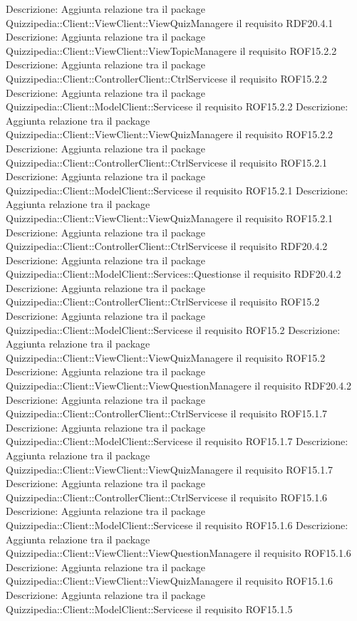 Descrizione: Aggiunta relazione tra il package Quizzipedia::Client::ViewClient::ViewQuizManagere il requisito RDF20.4.1 
Descrizione: Aggiunta relazione tra il package Quizzipedia::Client::ViewClient::ViewTopicManagere il requisito ROF15.2.2 
Descrizione: Aggiunta relazione tra il package Quizzipedia::Client::ControllerClient::CtrlServicese il requisito ROF15.2.2 
Descrizione: Aggiunta relazione tra il package Quizzipedia::Client::ModelClient::Servicese il requisito ROF15.2.2 
Descrizione: Aggiunta relazione tra il package Quizzipedia::Client::ViewClient::ViewQuizManagere il requisito ROF15.2.2 
Descrizione: Aggiunta relazione tra il package Quizzipedia::Client::ControllerClient::CtrlServicese il requisito ROF15.2.1 
Descrizione: Aggiunta relazione tra il package Quizzipedia::Client::ModelClient::Servicese il requisito ROF15.2.1 
Descrizione: Aggiunta relazione tra il package Quizzipedia::Client::ViewClient::ViewQuizManagere il requisito ROF15.2.1 
Descrizione: Aggiunta relazione tra il package Quizzipedia::Client::ControllerClient::CtrlServicese il requisito RDF20.4.2 
Descrizione: Aggiunta relazione tra il package Quizzipedia::Client::ModelClient::Services::Questionse il requisito RDF20.4.2 
Descrizione: Aggiunta relazione tra il package Quizzipedia::Client::ControllerClient::CtrlServicese il requisito ROF15.2 
Descrizione: Aggiunta relazione tra il package Quizzipedia::Client::ModelClient::Servicese il requisito ROF15.2 
Descrizione: Aggiunta relazione tra il package Quizzipedia::Client::ViewClient::ViewQuizManagere il requisito ROF15.2 
Descrizione: Aggiunta relazione tra il package Quizzipedia::Client::ViewClient::ViewQuestionManagere il requisito RDF20.4.2 
Descrizione: Aggiunta relazione tra il package Quizzipedia::Client::ControllerClient::CtrlServicese il requisito ROF15.1.7 
Descrizione: Aggiunta relazione tra il package Quizzipedia::Client::ModelClient::Servicese il requisito ROF15.1.7 
Descrizione: Aggiunta relazione tra il package Quizzipedia::Client::ViewClient::ViewQuizManagere il requisito ROF15.1.7 
Descrizione: Aggiunta relazione tra il package Quizzipedia::Client::ControllerClient::CtrlServicese il requisito ROF15.1.6 
Descrizione: Aggiunta relazione tra il package Quizzipedia::Client::ModelClient::Servicese il requisito ROF15.1.6 
Descrizione: Aggiunta relazione tra il package Quizzipedia::Client::ViewClient::ViewQuestionManagere il requisito ROF15.1.6 
Descrizione: Aggiunta relazione tra il package Quizzipedia::Client::ViewClient::ViewQuizManagere il requisito ROF15.1.6 
Descrizione: Aggiunta relazione tra il package Quizzipedia::Client::ModelClient::Servicese il requisito ROF15.1.5 

